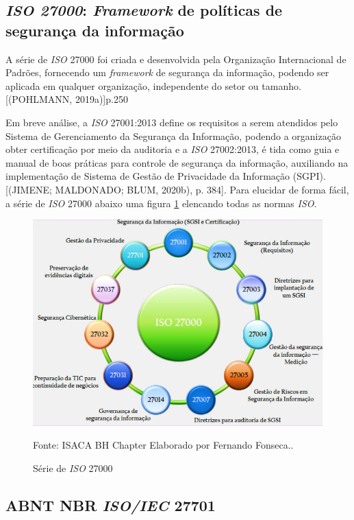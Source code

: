 \documentclass[
	12pt,				%
	openright,			%
	oneside,			%
	a4paper,			%
	english,			%
	french,				%
	spanish,			%
	brazil,				%
	]{abntex2}
\begin{document}
\subsection{\textit{ISO 27000}: \textit{Framework} de políticas de segurança da informação}

A série de \textit{ISO} 27000 foi criada e desenvolvida pela Organização Internacional de Padrões, fornecendo um \textit{framework} de segurança da informação, podendo ser aplicada em qualquer organização, independente do setor ou tamanho. [(POHLMANN, 2019a)]p.250

Em breve análise, a \textit{ISO} 27001:2013 define os requisitos a serem atendidos pelo Sistema de Gerenciamento da Segurança da Informação, podendo a organização obter certificação por meio da auditoria e a \textit{ISO} 27002:2013, é tida como guia e manual de boas práticas para controle de segurança da informação, auxiliando na implementação de Sistema de Gestão de Privacidade da Informação (SGPI). [(JIMENE; MALDONADO; BLUM, 2020b), p. 384]. Para elucidar de forma fácil, a série de \textit{ISO} 27000 abaixo uma figura \ref{fig: Iso } elencando todas as normas \textit{ISO}.

\begin{figure}[ht]
    \centering
    \caption{Série de \textit{ISO} 27000}
    \includegraphics[width=6.0in]{Images/03ISO.jpeg}
    
    \label{fig: Iso }
    \centering \small Fonte: ISACA BH Chapter Elaborado por Fernando Fonseca..
\end{figure}

\subsection{ABNT NBR \textit{ISO/IEC} 27701 }
\end{document}
